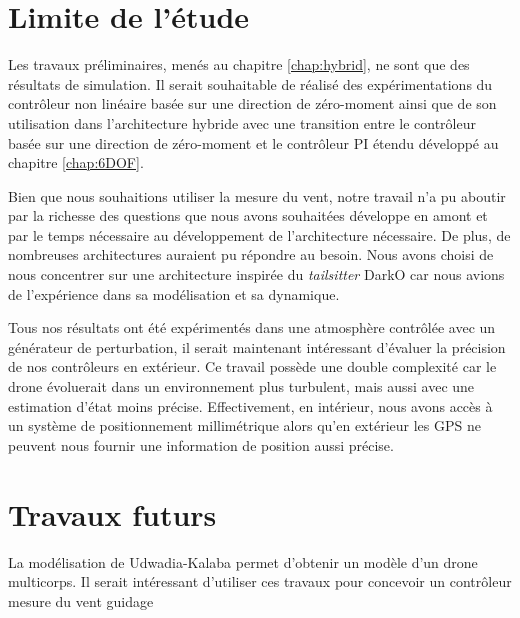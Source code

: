 {\section{Limite de l'étude}
Les travaux préliminaires, menés au chapitre \ref{chap:hybrid}, ne sont que des résultats de simulation. Il serait souhaitable de réalisé des expérimentations du contrôleur non linéaire basée sur une direction de zéro-moment ainsi que de son utilisation dans l'architecture hybride avec une transition entre le contrôleur basée sur une direction de zéro-moment et le contrôleur PI étendu développé au chapitre \ref{chap:6DOF}.

Bien que nous souhaitions utiliser la mesure du vent, notre travail n'a pu aboutir par la richesse des questions que nous avons souhaitées développe en amont et par le temps nécessaire au développement de l'architecture nécessaire.
De plus, de nombreuses architectures auraient pu répondre au besoin. Nous avons choisi de nous concentrer sur une architecture inspirée du \textit{tailsitter} DarkO car nous avions de l'expérience dans sa modélisation et sa dynamique.

Tous nos résultats ont été expérimentés dans une atmosphère contrôlée avec un générateur de perturbation, il serait maintenant intéressant d'évaluer la précision de nos contrôleurs en extérieur. Ce travail possède une double complexité car le drone évoluerait dans un environnement plus turbulent, mais aussi avec une estimation d'état moins précise. Effectivement, en intérieur, nous avons accès à un système de positionnement millimétrique alors qu'en extérieur les GPS ne peuvent nous fournir une information de position aussi précise.


\section{Travaux futurs}
{
    \color{green}
La modélisation de Udwadia-Kalaba permet d'obtenir un modèle d'un drone multicorps. Il serait intéressant d'utiliser ces travaux pour concevoir un contrôleur 
mesure du vent 
guidage 
}
}